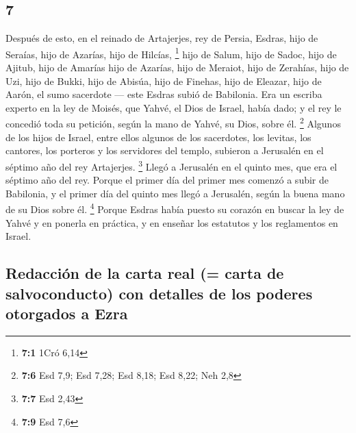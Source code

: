 \begin{paracol}{2}
\hypertarget{section-12}{%
\section{7}\label{section-12}}

 Después de esto, en el reinado de Artajerjes, rey de
Persia, Esdras, hijo de Seraías, hijo de Azarías, hijo de Hilcías,
\footnote{\textbf{7:1} 1Cró 6,14}  hijo de Salum, hijo de
Sadoc, hijo de Ajitub,  hijo de Amarías hijo de Azarías,
hijo de Meraiot,  hijo de Zerahías, hijo de Uzi, hijo de
Bukki,  hijo de Abisúa, hijo de Finehas, hijo de Eleazar,
hijo de Aarón, el sumo sacerdote ---  este Esdras subió de
Babilonia. Era un escriba experto en la ley de Moisés, que Yahvé, el
Dios de Israel, había dado; y el rey le concedió toda su petición, según
la mano de Yahvé, su Dios, sobre él. \footnote{\textbf{7:6} Esd 7,9; Esd
  7,28; Esd 8,18; Esd 8,22; Neh 2,8}  Algunos de los hijos
de Israel, entre ellos algunos de los sacerdotes, los levitas, los
cantores, los porteros y los servidores del templo, subieron a Jerusalén
en el séptimo año del rey Artajerjes. \footnote{\textbf{7:7} Esd 2,43}
 Llegó a Jerusalén en el quinto mes, que era el séptimo
año del rey.  Porque el primer día del primer mes comenzó
a subir de Babilonia, y el primer día del quinto mes llegó a Jerusalén,
según la buena mano de su Dios sobre él. \footnote{\textbf{7:9} Esd 7,6}
 Porque Esdras había puesto su corazón en buscar la ley
de Yahvé y en ponerla en práctica, y en enseñar los estatutos y los
reglamentos en Israel.

\hypertarget{redacciuxf3n-de-la-carta-real-carta-de-salvoconducto-con-detalles-de-los-poderes-otorgados-a-ezra}{%
\subsection{Redacción de la carta real (= carta de salvoconducto) con
detalles de los poderes otorgados a
Ezra}\label{redacciuxf3n-de-la-carta-real-carta-de-salvoconducto-con-detalles-de-los-poderes-otorgados-a-ezra}}


\end{paracol}
